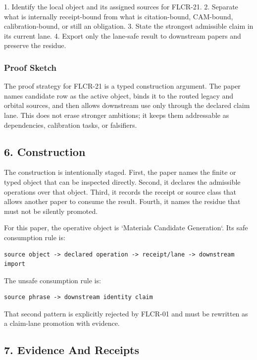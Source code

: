 \documentclass[11pt]{article}
\begin{document}
1. Identify the local object and its assigned sources for FLCR-21.
2. Separate what is internally receipt-bound from what is citation-bound, CAM-bound, calibration-bound, or still an obligation.
3. State the strongest admissible claim in its current lane.
4. Export only the lane-safe result to downstream papers and preserve the residue.

\subsubsection*{Proof Sketch}

The proof strategy for FLCR-21 is a typed construction argument. The paper names candidate row as the active object, binds it to the routed legacy and orbital sources, and then allows downstream use only through the declared claim lane. This does not erase stronger ambitions; it keeps them addressable as dependencies, calibration tasks, or falsifiers.

\subsection*{6. Construction}

The construction is intentionally staged. First, the paper names the finite or
typed object that can be inspected directly. Second, it declares the admissible
operations over that object. Third, it records the receipt or source class that
allows another paper to consume the result. Fourth, it names the residue that
must not be silently promoted.

For this paper, the operative object is `Materials Candidate Generation`. Its safe consumption
rule is:

\begin{verbatim}
source object -> declared operation -> receipt/lane -> downstream import
\end{verbatim}

The unsafe consumption rule is:

\begin{verbatim}
source phrase -> downstream identity claim
\end{verbatim}

That second pattern is explicitly rejected by FLCR-01 and must be rewritten as
a claim-lane promotion with evidence.

\subsection*{7. Evidence And Receipts}
\end{document}
